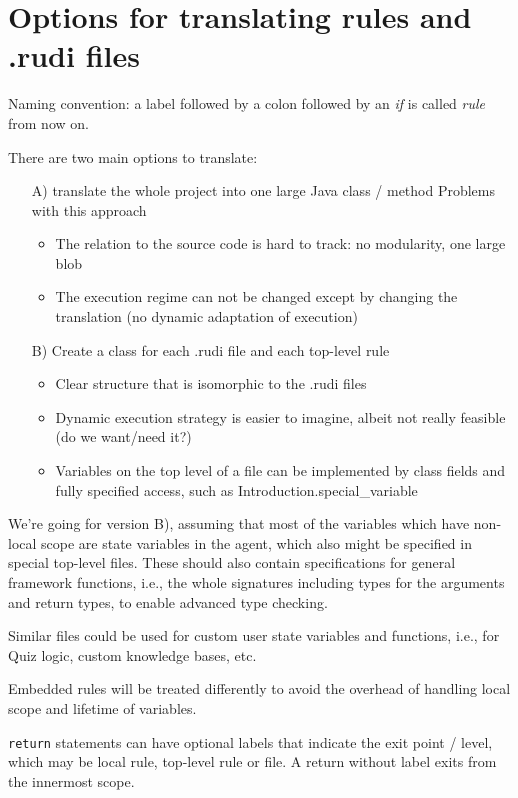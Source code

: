 \section{Options for translating rules and .rudi files}

Naming convention: a label followed by a colon followed by an \emph{if} is
called \emph{rule} from now on.

There are two main options to translate:
\begin{itemize}
\item[A)] translate the whole project into one large Java class / method
  Problems with this approach
  \begin{itemize}
  \item The relation to the source code is hard to track: no modularity, one
    large blob
  \item The execution regime can not be changed except by changing the
    translation (no dynamic adaptation of execution)
  \end{itemize}
\item[B)] Create a class for each .rudi file and each top-level rule
  \begin{itemize}
  \item Clear structure that is isomorphic to the .rudi files
  \item Dynamic execution strategy is easier to imagine, albeit not really
    feasible (do we want/need it?)
  \item Variables on the top level of a file can be implemented by class
    fields and fully specified access, such as Introduction.special\_variable
  \end{itemize}
\end{itemize}

We're going for version B), assuming that most of the variables which have
non-local scope are state variables in the agent, which also might be
specified in special top-level files. These should also contain specifications
for general framework functions, i.e., the whole signatures including types
for the arguments and return types, to enable advanced type checking.

Similar files could be used for custom user state variables and functions,
i.e., for Quiz logic, custom knowledge bases, etc.

Embedded rules will be treated differently to avoid the overhead of handling
local scope and lifetime of variables.

\texttt{return} statements can have optional labels that indicate the exit
point / level, which may be local rule, top-level rule or file. A return
without label exits from the innermost scope.

